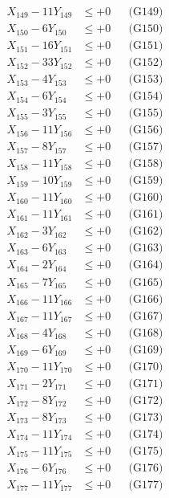 \documentclass[a4paper,10pt]{article}
\begin{document}
{\begin{align}
X_{149} - 11Y_{149} &\leq +0 && \text{(G149)} \\
X_{150} - 6Y_{150} &\leq +0 && \text{(G150)} \\
X_{151} - 16Y_{151} &\leq +0 && \text{(G151)} \\
X_{152} - 33Y_{152} &\leq +0 && \text{(G152)} \\
X_{153} - 4Y_{153} &\leq +0 && \text{(G153)} \\
\allowbreak
X_{154} - 6Y_{154} &\leq +0 && \text{(G154)} \\
X_{155} - 3Y_{155} &\leq +0 && \text{(G155)} \\
X_{156} - 11Y_{156} &\leq +0 && \text{(G156)} \\
X_{157} - 8Y_{157} &\leq +0 && \text{(G157)} \\
X_{158} - 11Y_{158} &\leq +0 && \text{(G158)} \\
X_{159} - 10Y_{159} &\leq +0 && \text{(G159)} \\
X_{160} - 11Y_{160} &\leq +0 && \text{(G160)} \\
X_{161} - 11Y_{161} &\leq +0 && \text{(G161)} \\
X_{162} - 3Y_{162} &\leq +0 && \text{(G162)} \\
X_{163} - 6Y_{163} &\leq +0 && \text{(G163)} \\
\allowbreak
X_{164} - 2Y_{164} &\leq +0 && \text{(G164)} \\
X_{165} - 7Y_{165} &\leq +0 && \text{(G165)} \\
X_{166} - 11Y_{166} &\leq +0 && \text{(G166)} \\
X_{167} - 11Y_{167} &\leq +0 && \text{(G167)} \\
X_{168} - 4Y_{168} &\leq +0 && \text{(G168)} \\
X_{169} - 6Y_{169} &\leq +0 && \text{(G169)} \\
X_{170} - 11Y_{170} &\leq +0 && \text{(G170)} \\
X_{171} - 2Y_{171} &\leq +0 && \text{(G171)} \\
X_{172} - 8Y_{172} &\leq +0 && \text{(G172)} \\
X_{173} - 8Y_{173} &\leq +0 && \text{(G173)} \\
\allowbreak
X_{174} - 11Y_{174} &\leq +0 && \text{(G174)} \\
X_{175} - 11Y_{175} &\leq +0 && \text{(G175)} \\
X_{176} - 6Y_{176} &\leq +0 && \text{(G176)} \\
X_{177} - 11Y_{177} &\leq +0 && \text{(G177)} \\

\end{align}}
\end{document}
